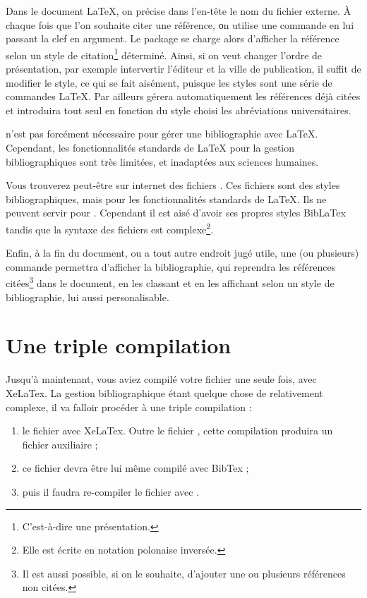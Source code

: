 Dans le document \LaTeX{}, on précise dans l'en-tête le nom du fichier externe. À chaque fois que l'on souhaite citer une référence, οn utilise une commande en lui passant la clef en argument. Le package  se charge alors d'afficher la référence selon un style de citation\footnote{C’est-à-dire une présentation.} déterminé. Ainsi, si on veut changer l'ordre de présentation, par exemple intervertir l'éditeur et la ville de publication, il suffit de modifier le style, ce qui se fait aisément, puisque les styles sont une série de commandes \LaTeX{}. Par ailleurs  gérera automatiquement les références déjà citées et introduira tout seul en fonction du style choisi les abréviations universitaires. 

\begin{anedocte}

 n'est pas forcément nécessaire pour gérer une bibliographie avec \LaTeX{}. Cependant, les fonctionnalités standards de LaTeX pour la gestion bibliographiques sont très limitées, et inadaptées aux sciences humaines. 

Vous trouverez peut-être sur internet des fichiers . Ces fichiers sont des styles bibliographiques, mais pour les fonctionnalités standards de \LaTeX{}. Ils ne peuvent servir pour . Cependant il est aisé d'avoir ses propres styles BibLaTex tandis que la syntaxe des fichiers  est complexe\footnote{Elle est écrite en notation polonaise inversée.}.

\end{anedocte}

Enfin, à la fin du document, ou a tout autre endroit jugé utile, une (ou plusieurs) commande permettra d'afficher la bibliographie, qui reprendra les références citées\footnote{Il est aussi possible, si on le souhaite, d'ajouter une ou plusieurs références non citées.} dans le document, en les classant et en les affichant selon un style de bibliographie, lui aussi personalisable.

\section{Une triple compilation}\label{3compil}

Jusqu'à maintenant, vous aviez compilé votre fichier  une seule fois, avec XeLaTex. La gestion bibliographique étant quelque chose de relativement complexe, il va falloir procéder à une triple compilation :
\begin{enumerate}
\item le fichier  avec XeLaTex. Outre le fichier , cette compilation produira un fichier auxiliaire  ;
\item ce fichier devra être lui même compilé avec BibTex ;
\item puis il faudra re-compiler le fichier  avec \XeLaTeX.
\end{enumerate}


